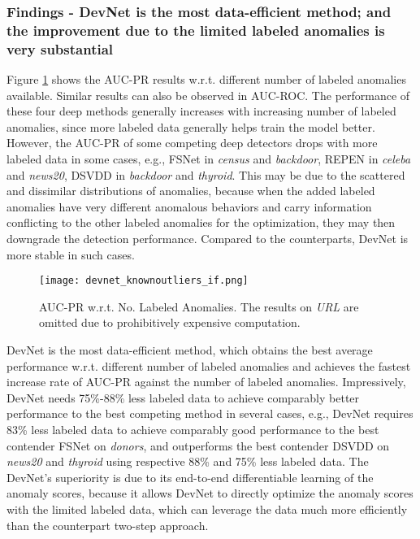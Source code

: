 \documentclass[sigconf]{acmart}
\begin{document}
\subsubsection{Findings - DevNet is the most data-efficient method; and the improvement due to the limited labeled anomalies is very substantial}
Figure \ref{fig:knownouliers} shows the AUC-PR results w.r.t. different number of labeled anomalies available. Similar results can also be observed in AUC-ROC. The performance of these four deep methods generally increases with increasing number of labeled anomalies, since more labeled data generally helps train the model better. However, the AUC-PR of some competing deep detectors drops with more labeled data in some cases, e.g., FSNet in \textit{census} and \textit{backdoor}, REPEN in \textit{celeba} and \textit{news20}, DSVDD in \textit{backdoor} and \textit{thyroid}. This may be due to the scattered and dissimilar distributions of anomalies, because when the added labeled anomalies have very different anomalous behaviors and carry information conflicting to the other labeled anomalies for the optimization, they may then downgrade the detection performance. Compared to the counterparts, DevNet is more stable in such cases.

\begin{figure}[h!]
  \centering
    \texttt{[image: devnet\_knownoutliers\_if.png]}
  \caption{AUC-PR w.r.t. No. Labeled Anomalies. The results on \textit{URL} are omitted due to prohibitively expensive computation.}
  \label{fig:knownouliers}
\end{figure}

DevNet is the most data-efficient method, which obtains the best average performance w.r.t. different number of labeled anomalies and achieves the fastest increase rate of AUC-PR against the number of labeled anomalies. Impressively, DevNet needs 75\%-88\% less labeled data to achieve comparably better performance to the best competing method in several cases, e.g., DevNet requires 83\% less labeled data to achieve comparably good performance to the best contender FSNet on \textit{donors}, and outperforms the best contender DSVDD on \textit{news20} and \textit{thyroid} using respective 88\% and 75\% less labeled data. The DevNet's superiority is due to its end-to-end differentiable learning of the anomaly scores, because it allows DevNet to directly optimize the anomaly scores with the limited labeled data, which can leverage the data much more efficiently than the counterpart two-step approach.
\end{document}
